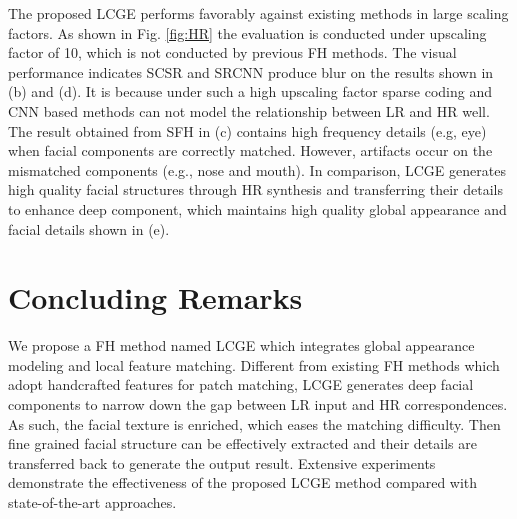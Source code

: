 \documentclass{article}
\begin{document}
The proposed LCGE performs favorably against existing methods in large scaling factors. As shown in Fig. \ref{fig:HR} the evaluation is conducted under upscaling factor of 10, which is not conducted by previous FH methods. The visual performance indicates SCSR and SRCNN produce blur on the results shown in (b) and (d). It is because under such a high upscaling factor sparse coding and CNN based methods can not model the relationship between LR and HR well. The result obtained from SFH in (c) contains high frequency details (e.g, eye) when facial components are correctly matched. However, artifacts occur on the mismatched components (e.g., nose and mouth). In comparison, LCGE generates high quality facial structures through HR synthesis and transferring their details to enhance deep component, which maintains high quality global appearance and facial details shown in (e).

\section{Concluding Remarks}
We propose a FH method named LCGE which integrates global appearance modeling and local feature matching. Different from existing FH methods which adopt handcrafted features for patch matching, LCGE generates deep facial components to narrow down the gap between LR input and HR correspondences. As such, the facial texture is enriched, which eases the matching difficulty. Then fine grained facial structure can be effectively extracted and their details are transferred back to generate the output result. Extensive experiments demonstrate the effectiveness of the proposed LCGE method compared with state-of-the-art approaches.

\clearpage
\small


\end{document}

